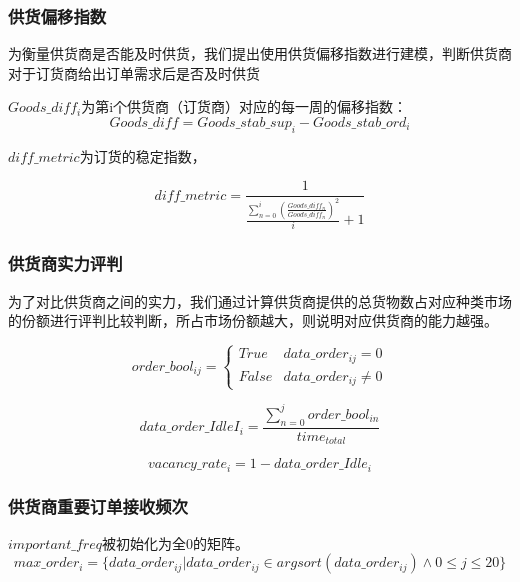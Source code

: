 \documentclass[UTF8]{ctexart}
\begin{document}
\subsubsection{供货偏移指数}
为衡量供货商是否能及时供货，我们提出使用供货偏移指数进行建模，判断供货商对于订货商给出订单需求后是否及时供货

$Goods\_diff_{i}$为第i个供货商（订货商）对应的每一周的偏移指数：
\begin{equation}
	Goods\_diff = Goods\_stab\_sup_{i} - Goods\_stab\_ord_{i}
\end{equation}

$diff\_metric$为订货的稳定指数，

\begin{equation}
	diff\_metric =\frac{1}{\frac{\sum^{i}_{n=0}(\frac{Goods\_diff_{n}}{Goods\_diff_{n}})^2}{i}+1}
\end{equation}

\subsubsection{供货商实力评判}
为了对比供货商之间的实力，我们通过计算供货商提供的总货物数占对应种类市场的份额进行评判比较判断，所占市场份额越大，则说明对应供货商的能力越强。

\begin{equation}
	order\_bool_{ij}=\left\{\begin{array}{llcl}

		True  & data\_order_{ij}=0    \\
		False & data\_order_{ij}\neq0
	\end{array} \right.
\end{equation}

\begin{equation}
	data\_order\_IdleI_i=\frac{\sum_{n=0}^j order\_bool_{in}}{time_{total}}
\end{equation}

\begin{equation}
	vacancy\_rate_i = 1-data\_order\_Idle_i
\end{equation}


\subsubsection{供货商重要订单接收频次}

$important\_freq$被初始化为全0的矩阵。
\begin{equation}
	max\_order_{i} =\{data\_order_{ij}|data\_order_{ij}∈argsort(data\_order_{ij}) \wedge 0\leq j\leq20\}
\end{equation}
\end{document}
